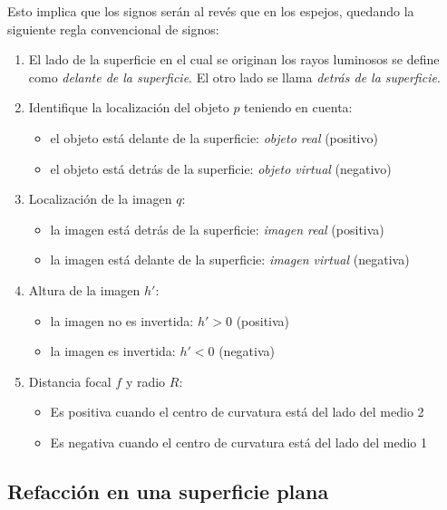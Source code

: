 \noindent Esto implica que los signos serán al revés que en los espejos, quedando la siguiente regla convencional de signos:
\begin{enumerate}
  \item El lado de la superficie en el cual se originan los rayos luminosos se define como \textit{delante de la superficie}. El otro lado se llama \textit{detrás de la superficie}.
  \item Identifique la localización del objeto \(p\) teniendo en cuenta:
    \begin{itemize}
      \item el objeto está delante de la superficie: \textit{objeto real} (positivo)
      \item el objeto está detrás de la superficie: \textit{objeto virtual} (negativo)
    \end{itemize}
  \item  Localización de la imagen \(q\):
    \begin{itemize}
      \item la imagen está detrás de la superficie: \textit{imagen real} (positiva)
      \item la imagen está delante de la superficie: \textit{imagen virtual} (negativa)
    \end{itemize}
  \item Altura de la imagen \(h'\):
    \begin{itemize}
      \item la imagen no es invertida: \(h' > 0\) (positiva)
      \item la imagen es invertida: \(h' < 0\) (negativa)
    \end{itemize}
  \item Distancia focal \(f\) y radio \(R\):
    \begin{itemize}
      \item Es positiva cuando el centro de curvatura está del lado del medio 2
      \item Es negativa cuando el centro de curvatura está del lado del medio 1
    \end{itemize}
\end{enumerate}

\subsection{Refacción en una superficie plana}

